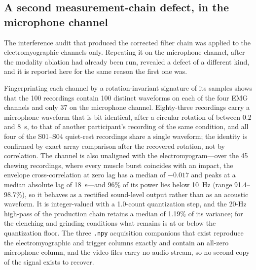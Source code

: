 \documentclass[pdflatex,sn-nature,iicol]{sn-jnl}
\begin{document}
\subsection{A second measurement-chain defect, in the microphone channel}
\label{sec:mic_defect}

The interference audit that produced the corrected filter chain was applied to the electromyographic channels only. Repeating it on the microphone channel, after the modality ablation had already been run, revealed a defect of a different kind, and it is reported here for the same reason the first one was.

Fingerprinting each channel by a rotation-invariant signature of its samples shows that the 100 recordings contain 100 distinct waveforms on each of the four EMG channels and only 37 on the microphone channel. Eighty-three recordings carry a microphone waveform that is bit-identical, after a circular rotation of between 0.2 and 8~s, to that of another participant's recording of the same condition, and all four of the S01--S04 quiet-rest recordings share a single waveform; the identity is confirmed by exact array comparison after the recovered rotation, not by correlation. The channel is also unaligned with the electromyogram---over the 45 chewing recordings, where every muscle burst coincides with an impact, the envelope cross-correlation at zero lag has a median of $-0.017$ and peaks at a median absolute lag of 18~s---and 96\% of its power lies below 10~Hz (range 91.4--98.7\%), so it behaves as a rectified sound-level output rather than as an acoustic waveform. It is integer-valued with a 1.0-count quantization step, and the 20-Hz high-pass of the production chain retains a median of 1.19\% of its variance; for the clenching and grinding conditions what remains is at or below the quantization floor. The three \texttt{.npy} acquisition companions that exist reproduce the electromyographic and trigger columns exactly and contain an all-zero microphone column, and the video files carry no audio stream, so no second copy of the signal exists to recover.
\end{document}
